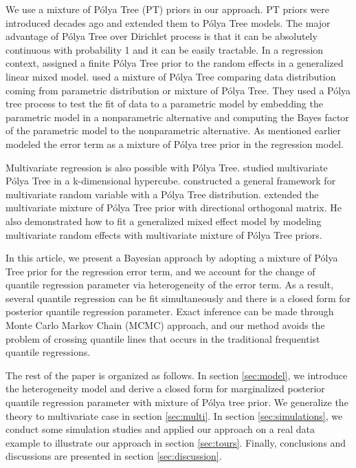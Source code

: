 \documentclass[12pt]{article}
\newcommand{\polya}{P\'{o}lya}
\begin{document}
We use a mixture of \polya{} Tree (PT) priors in our approach. PT
priors were introduced decades ago \citep{freedman1963, fabius1964,
  ferguson1974} and \citet{lavine1992, lavine1994} extended them to
\polya{} Tree models. The major advantage of \polya{} Tree over
Dirichlet process is that it can be absolutely continuous with
probability 1 and it can be easily tractable. In a regression
context, \citet{walker1997, walker1999} assigned a finite \polya{}
Tree prior to the random effects in a generalized linear mixed
model. \citet{berger2001} used a mixture of \polya{} Tree comparing
data distribution coming from parametric distribution or mixture of
\polya{} Tree. They used a \polya{} tree process to test the fit of
data to a parametric model by embedding the parametric model in a
nonparametric alternative and computing the Bayes factor of the
parametric model to the nonparametric alternative.  As mentioned
earlier \citet{hanson2002} modeled the error term as a mixture of
\polya{} tree prior in the regression model.

Multivariate regression is also possible with \polya{}
Tree. \citet{paddock1999, paddock2002} studied multivariate \polya{}
Tree in a k-dimensional hypercube. \citet{hanson2006} constructed a
general framework for multivariate random variable with a \polya{}
Tree distribution. \citet{jara2009} extended the multivariate mixture
of \polya{} Tree prior with directional orthogonal matrix.  He also
demonstrated how to fit a generalized mixed effect model by modeling
multivariate random effects with multivariate mixture of \polya{} Tree
priors.

In this article, we present a Bayesian approach by adopting a mixture
of \polya{} Tree prior for the regression error term, and we account
for the change of quantile regression parameter via heterogeneity of
the error term. As a result, several quantile regression can be fit
simultaneously and there is a closed form for posterior quantile
regression parameter. Exact inference can be made through Monte Carlo
Markov Chain (MCMC) approach, and our method avoids the problem of
crossing quantile lines that occurs in the traditional frequentist
quantile regressions.

The rest of the paper is organized as follows. In section
\ref{sec:model}, we introduce the heterogeneity model and derive a
closed form for marginalized posterior quantile regression parameter
with mixture of \polya{} tree prior. We generalize the theory to
multivariate case in section \ref{sec:multi}.  In section
\ref{sec:simulations}, we conduct some simulation studies and applied
our approach on a real data example to illustrate our approach in
section \ref{sec:tours}. Finally, conclusions and discussions are
presented in section \ref{sec:discussion}.
\end{document}
